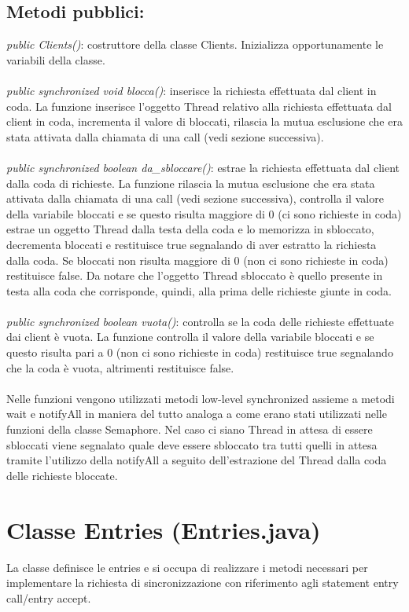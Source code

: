 \documentclass[10pt, a4paper]{article}
\begin{document}
\subsection{Metodi pubblici:}
\textit{public Clients()}: costruttore della classe Clients. Inizializza opportunamente le variabili della classe.
\\\\
\textit{public synchronized void blocca()}: inserisce la richiesta effettuata dal client in coda. La funzione inserisce l'oggetto Thread relativo alla richiesta effettuata dal client in coda, incrementa il valore di bloccati, rilascia la mutua esclusione che era stata attivata dalla chiamata di una call (vedi sezione successiva).
\\\\
\textit{public synchronized boolean da\_sbloccare()}: estrae la richiesta effettuata dal client dalla coda di richieste. La funzione rilascia la mutua esclusione che era stata attivata dalla chiamata di una call (vedi sezione successiva), controlla il valore della variabile bloccati e se questo risulta maggiore di 0 (ci sono richieste in coda) estrae un oggetto Thread dalla testa della coda e lo memorizza in sbloccato, decrementa bloccati e restituisce true segnalando di aver estratto la richiesta dalla coda. Se bloccati non risulta maggiore di 0 (non ci sono richieste in coda) restituisce false. Da notare che l'oggetto Thread sbloccato è quello presente in testa alla coda che corrisponde, quindi, alla prima delle richieste giunte in coda.
\\\\
\textit{public synchronized boolean vuota()}: controlla se la coda delle richieste effettuate dai client è vuota. La funzione controlla il valore della variabile bloccati e se questo risulta pari a 0 (non ci sono richieste in coda) restituisce true segnalando che la coda è vuota, altrimenti restituisce false.
\\\\
Nelle funzioni vengono utilizzati metodi low-level synchronized assieme a metodi wait e notifyAll in maniera del tutto analoga a come erano stati utilizzati nelle funzioni della classe Semaphore. Nel caso ci siano Thread in attesa di essere sbloccati viene segnalato quale deve essere sbloccato tra tutti quelli in attesa tramite l'utilizzo della notifyAll a seguito dell'estrazione del Thread dalla coda delle richieste bloccate.
\section{Classe Entries (Entries.java)}
La classe definisce le entries e si occupa di realizzare i metodi necessari per implementare la richiesta di sincronizzazione con riferimento agli statement entry call/entry accept.
\end{document}
